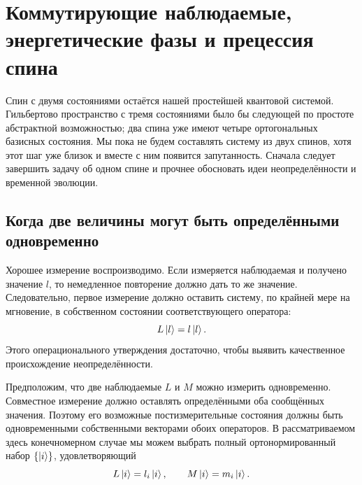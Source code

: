 \chapter{Коммутирующие наблюдаемые, энергетические фазы и прецессия спина}


Спин с двумя состояниями остаётся нашей простейшей квантовой системой. Гильбертово пространство с тремя состояниями было бы следующей по простоте абстрактной возможностью; два спина уже имеют четыре ортогональных базисных состояния. Мы пока не будем составлять систему из двух спинов, хотя этот шаг уже близок и вместе с ним появится запутанность. Сначала следует завершить задачу об одном спине и прочнее обосновать идеи неопределённости и временной эволюции.

\section{Когда две величины могут быть определёнными одновременно}

Хорошее измерение воспроизводимо. Если измеряется наблюдаемая и получено значение \(l\), то немедленное повторение должно дать то же значение. Следовательно, первое измерение должно оставить систему, по крайней мере на мгновение, в собственном состоянии соответствующего оператора:
\begin{equation}
L\left\lvert l\right\rangle=l\left\lvert l\right\rangle.
\end{equation}
Этого операционального утверждения достаточно, чтобы выявить качественное происхождение неопределённости.

Предположим, что две наблюдаемые \(L\) и \(M\) можно измерить одновременно. Совместное измерение должно оставлять определёнными оба сообщённых значения. Поэтому его возможные постизмерительные состояния должны быть одновременными собственными векторами обоих операторов. В рассматриваемом здесь конечномерном случае мы можем выбрать полный ортонормированный набор \(\{\left\lvert i\right\rangle\}\), удовлетворяющий
\begin{equation}
L\left\lvert i\right\rangle=l_i\left\lvert i\right\rangle,
\qquad
M\left\lvert i\right\rangle=m_i\left\lvert i\right\rangle.
\label{eq:l5-common-eigenvectors}
\end{equation}

